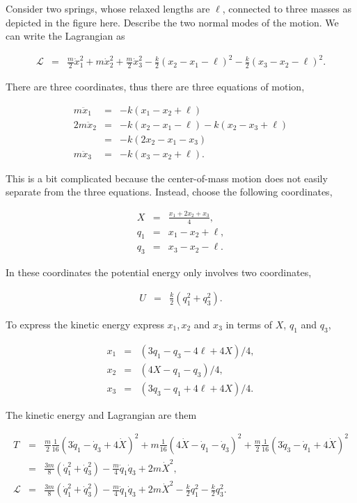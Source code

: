 \documentclass[%
oneside,                 %
final,                   %
10pt]{article}
\begin{document}
Consider two springs, whose relaxed lengths are $\ell$, connected to three masses as depicted in the figure here. Describe the two normal modes of the motion. We can write the Lagrangian as

\begin{eqnarray*}
\mathcal{L}&=&\frac{m}{2}\dot{x}_1^2+m\dot{x}_2^2+\frac{m}{2}\dot{x}_3^2
-\frac{k}{2}(x_2-x_1-\ell)^2-\frac{k}{2}(x_3-x_2-\ell)^2.
\end{eqnarray*}

There are three coordinates, thus there are three equations of motion,

\begin{eqnarray*}
m\ddot{x}_1&=&-k(x_1-x_2+\ell)\\
2m\ddot{x}_2&=&-k(x_2-x_1-\ell)-k(x_2-x_3+\ell)\\
&=&-k(2x_2-x_1-x_3)\\
m\ddot{x}_3&=&-k(x_3-x_2+\ell).
\end{eqnarray*}

This is a bit complicated because the center-of-mass motion does not easily separate from the three equations. Instead, choose the following coordinates,

\begin{eqnarray*}
X&=&\frac{x_1+2x_2+x_3}{4},\\
q_1&=&x_1-x_2+\ell,\\
q_3&=&x_3-x_2-\ell.
\end{eqnarray*}

In these coordinates the potential energy only involves two coordinates,

\begin{eqnarray*}
U&=&\frac{k}{2}(q_1^2+q_3^2).
\end{eqnarray*}

To express the kinetic energy express $x_1, x_2$ and $x_3$ in terms of
$X$, $q_1$ and $q_3$,

\begin{eqnarray*}
x_1&=&(3q_1-q_3-4\ell+4X)/4,\\
x_2&=&(4X-q_1-q_3)/4,\\
x_3&=&(3q_3-q_1+4\ell+4X)/4.
\end{eqnarray*}

The kinetic energy and Lagrangian are them

\begin{eqnarray*}
T&=&\frac{m}{2}\frac{1}{16}(3\dot{q}_1-\dot{q}_3+4\dot{X})^2
+m\frac{1}{16}(4\dot{X}-\dot{q}_1-\dot{q}_3)^2
+\frac{m}{2}\frac{1}{16}(3\dot{q}_3-\dot{q}_1+4\dot{X})^2\\
&=&\frac{3m}{8}(\dot{q}_1^2+\dot{q}_3^2)-\frac{m}{4}\dot{q}_1\dot{q}_3
+2m\dot{X}^2,\\
\mathcal{L}&=&\frac{3m}{8}(\dot{q}_1^2+\dot{q}_3^2)-\frac{m}{4}\dot{q}_1\dot{q}_3
+2m\dot{X}^2-\frac{k}{2}q_1^2-\frac{k}{2}q_3^2.
\end{eqnarray*}
\end{document}
